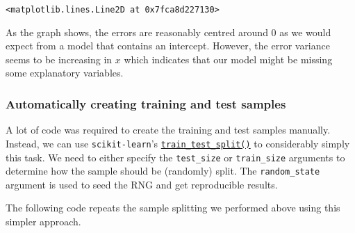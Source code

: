 \documentclass{scrartcl}
\makeatletter
\newcommand{\boxspacing}{\kern\kvtcb@left@rule\kern\kvtcb@boxsep}
\newcommand{\prompt}[4]{
        {\ttfamily\llap{{\color{#2}[#3]:\hspace{3pt}#4}}\vspace{-\baselineskip}}
    }
\makeatother
\begin{document}
            \begin{tcolorbox}[breakable, size=fbox, boxrule=.5pt, pad at break*=1mm, opacityfill=0]
\prompt{Out}{outcolor}{11}{\boxspacing}
\begin{Verbatim}[commandchars=\\\{\}]
<matplotlib.lines.Line2D at 0x7fca8d227130>
\end{Verbatim}
\end{tcolorbox}
        
    \begin{center}
    \end{center}
    
    As the graph shows, the errors are reasonably centred around \(0\) as we
would expect from a model that contains an intercept. However, the error
variance seems to be increasing in \(x\) which indicates that our model
might be missing some explanatory variables.

    \hypertarget{automatically-creating-training-and-test-samples}{%
\subsubsection*{Automatically creating training and test
samples}\label{automatically-creating-training-and-test-samples}}

A lot of code was required to create the training and test samples
manually. Instead, we can use \texttt{scikit-learn}'s
\href{https://scikit-learn.org/stable/modules/generated/sklearn.model_selection.train_test_split.html}{\texttt{train\_test\_split()}}
to considerably simply this task. We need to either specify the
\texttt{test\_size} or \texttt{train\_size} arguments to determine how
the sample should be (randomly) split. The \texttt{random\_state}
argument is used to seed the RNG and get reproducible results.

The following code repeats the sample splitting we performed above using
this simpler approach.
\end{document}

